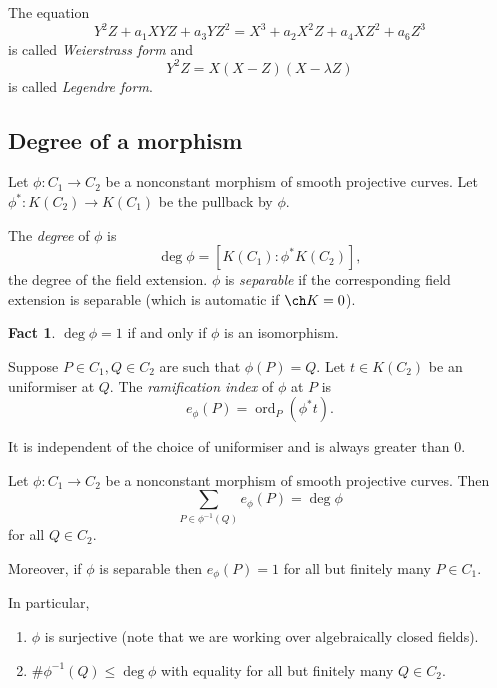 \documentclass[a4paper]{article}
\theoremstyle{definition}
\newtheorem*{fact}{Fact}
\DeclareMathOperator{\ord}{ord}
\begin{document}
The equation
\[
  Y^2Z + a_1 XYZ + a_3 YZ^2 = X^3 + a_2 X^2Z + a_4 XZ^2 + a_6 Z^3
\]
is called \emph{Weierstrass form} and
\[
  Y^2Z = X(X - Z)(X - \lambda Z)
\]
is called \emph{Legendre form}.

\subsection{Degree of a morphism}

Let \(\phi: C_1 \to C_2\) be a nonconstant morphism of smooth projective curves. Let \(\phi^*: K(C_2) \to K(C_1)\) be the pullback by \(\phi\).

\begin{definition}
  The \emph{degree} of \(\phi\) is
  \[
    \deg \phi = [K(C_1): \phi^*K(C_2)],
  \]
  the degree of the field extension. \(\phi\) is \emph{separable} if the corresponding field extension is separable (which is automatic if \(\ch K = 0\)).
\end{definition}

\begin{fact}
  \(\deg \phi = 1\) if and only if \(\phi\) is an isomorphism.
\end{fact}

\begin{definition}
  Suppose \(P \in C_1, Q \in C_2\) are such that \(\phi(P) = Q\). Let \(t \in K(C_2)\) be an uniformiser at \(Q\). The \emph{ramification index} of \(\phi\) at \(P\) is
  \[
    e_\phi(P) = \ord_P(\phi^*t).
  \]
\end{definition}

It is independent of the choice of uniformiser and is always greater than \(0\).
 
\begin{theorem}
  Let \(\phi: C_1 \to C_2\) be a nonconstant morphism of smooth projective curves. Then
  \[
    \sum_{P \in \phi^{-1}(Q)} e_\phi(P) = \deg \phi
  \]
  for all \(Q \in C_2\).

  Moreover, if \(\phi\) is separable then \(e_\phi(P) = 1\) for all but finitely many \(P \in C_1\).
\end{theorem}

In particular,
\begin{enumerate}
\item \(\phi\) is surjective (note that we are working over algebraically closed fields).
\item \(\# \phi^{-1}(Q) \leq \deg \phi\) with equality for all but finitely many \(Q \in C_2\).
\end{enumerate}
\end{document}
